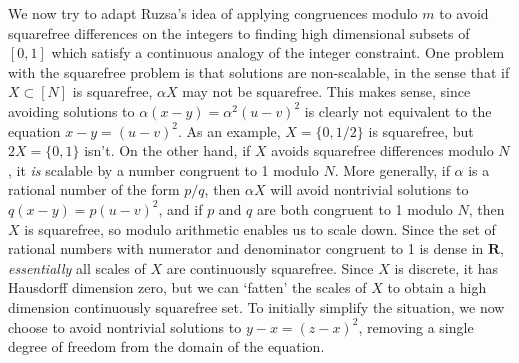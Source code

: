 \documentclass{report}
\theoremstyle{plain}
\theoremstyle{plain}
\begin{document}
We now try to adapt Ruzsa's idea of applying congruences modulo $m$ to avoid squarefree differences on the integers to finding high dimensional subsets of $[0,1]$ which satisfy a continuous analogy of the integer constraint. One problem with the squarefree problem is that solutions are non-scalable, in the sense that if $X \subset [N]$ is squarefree, $\alpha X$ may not be squarefree. This makes sense, since avoiding solutions to $\alpha (x - y) = \alpha^2 (u - v)^2$ is clearly not equivalent to the equation $x - y = (u - v)^2$. As an example, $X = \{ 0, 1/2 \}$ is squarefree, but $2X = \{ 0, 1 \}$ isn't. On the other hand, if $X$ avoids squarefree differences modulo $N$, it {\it is} scalable by a number congruent to 1 modulo $N$. More generally, if $\alpha$ is a rational number of the form $p/q$, then $\alpha X$ will avoid nontrivial solutions to $q (x - y) = p (u - v)^2$, and if $p$ and $q$ are both congruent to 1 modulo $N$, then $X$ is squarefree, so modulo arithmetic enables us to scale down. Since the set of rational numbers with numerator and denominator congruent to 1 is dense in $\mathbf{R}$, {\it essentially} all scales of $X$ are continuously squarefree. Since $X$ is discrete, it has Hausdorff dimension zero, but we can `fatten' the scales of $X$ to obtain a high dimension continuously squarefree set. To initially simplify the situation, we now choose to avoid nontrivial solutions to $y - x = (z - x)^2$, removing a single degree of freedom from the domain of the equation.
\end{document}
